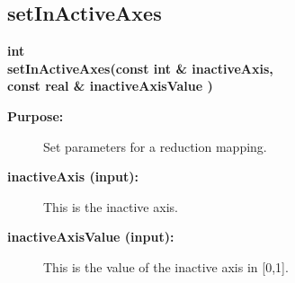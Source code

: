 \subsection{setInActiveAxes}
 
\begin{flushleft} \textbf{%
int  \\ 
\settowidth{\ReductionMappingIncludeArgIndent}{setInActiveAxes(}%
setInActiveAxes(const int \& inactiveAxis,\\ 
\hspace{\ReductionMappingIncludeArgIndent}const real \& inactiveAxisValue ) 
}\end{flushleft}
\begin{description}
\item[{\bf Purpose:}]  Set parameters for a reduction mapping.

\item[{\bf inactiveAxis (input):}]  This is the inactive axis.
\item[{\bf inactiveAxisValue (input):}]  This is the value of the inactive axis in [0,1].

\end{description}
